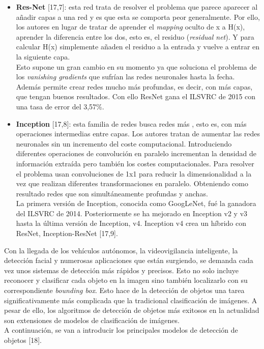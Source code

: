 \documentclass{bmvc2k}
\begin{document}
\begin{itemize}
\item \textbf{Res-Net} [17,7]: esta red trata de resolver el problema que parece aparecer al añadir capas a una red y es que esta se comporta peor generalmente. Por ello, los autores en lugar de tratar de aprender el \textit{mapping} oculto de x a H(x), aprender la diferencia entre los dos, esto es, el residuo (\textit{residual net}). Y para calcular H(x) simplemente añaden el residuo a la entrada y vuelve a entrar en la siguiente capa.\\ Esto supone un gran cambio en su momento ya que soluciona el problema de los \textit{vanishing gradients} que sufrían las redes neuronales hasta la fecha. Además permite crear redes mucho más profundas, es decir, con más capas, que tengan buenos resultados. Con ello ResNet gana el ILSVRC de 2015 con una tasa de error del 3,57\%.
\item \textbf{Inception} [17,8]: esta familia de redes busca redes más , esto es, con más operaciones intermedias entre capas. Los autores tratan de aumentar las redes neuronales sin un incremento del coste computacional. Introduciendo diferentes operaciones de convolución en paralelo incrementan la densidad de información extraída pero también los costes computacionales. Para resolver el problema usan convoluciones de 1x1 para reducir la dimensionalidad a la vez que realizan diferentes transformaciones en paralelo. Obteniendo como resultado redes que son simultáneamente profundas y anchas.\\
La primera versión de Inception, conocida como GoogLeNet, fué la ganadora del ILSVRC de 2014. Posteriormente se ha mejorado en Inception v2 y v3 hasta la última versión de Inception, v4. Inception v4 crea un híbrido con ResNet, Inception-ResNet [17,9].
\end{itemize}
Con la llegada de los vehículos autónomos, la videovigilancia inteligente, la detección facial y numerosas aplicaciones que están surgiendo, se demanda cada vez unos sistemas de detección más rápidos y precisos. Esto no solo incluye reconocer y clasificar cada objeto en la imagen sino también localizarlo con su correspondiente \textit{bounding box}. Esto hace de la detección de objetos una tarea significativamente más complicada que la tradicional clasificación de imágenes. A pesar de ello, los algoritmos de detección de objetos más exitosos en la actualidad son extensiones de modelos de clasificación de imágenes.\\
A continuación, se van a introducir los principales modelos de detección de objetos [18].
\end{document}

